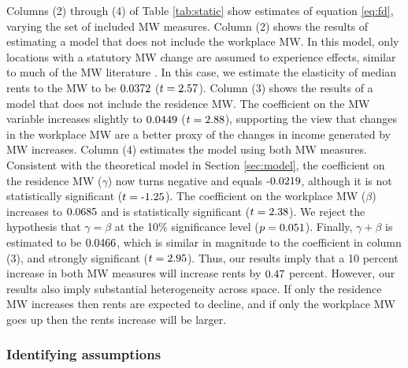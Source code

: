 Columns (2) through (4) of Table \ref{tab:static} show estimates of equation 
\eqref{eq:fd}, varying the set of included MW measures.
Column (2) shows the results of estimating a model that does not include the 
workplace MW.
In this model, only locations with a statutory MW change are assumed to 
experience effects, similar to much of the MW literature 
\parencite[e.g.,][]{DubeEtAl2010, MeerWest2016, Yamagishi2021}.
In this case, we estimate the elasticity of median rents to the MW to be 
$\textnormal{0.0372}$ ($t=\textnormal{2.57}$).
Column (3) shows the results of a model that does not include the residence MW.
The coefficient on the MW variable increases slightly to 
$\textnormal{0.0449}$ ($t=\textnormal{2.88}$), 
supporting the view that changes in the workplace MW are a better proxy of 
the changes in income generated by MW increases.
Column (4) estimates the model using both MW measures.
Consistent with the theoretical model in Section \ref{sec:model}, the 
coefficient on the residence MW ($\gamma$) now turns negative and equals 
$\textnormal{-0.0219}$, although it is not statistically significant 
($t=\textnormal{-1.25}$).
The coefficient on the workplace MW ($\beta$) increases to $\textnormal{0.0685}$ and 
is statistically significant ($t=\textnormal{2.38}$).
We reject the hypothesis that $\gamma=\beta$ at the 10\% significance level 
($p = \textnormal{0.051}$).
Finally, $\gamma+\beta$ is estimated to be $\textnormal{0.0466}$, which is similar 
in magnitude to the coefficient in column (3), and strongly 
significant ($t=\textnormal{2.95}$).
Thus, our results imply that a 10 percent increase in both MW measures will 
increase rents by $\textnormal{0.47}$ percent.
However, our results also imply substantial heterogeneity across space.
If only the residence MW increases then rents are expected to decline,
and if only the workplace MW goes up then the rents increase will be larger.

\subsubsection*{Identifying assumptions}

